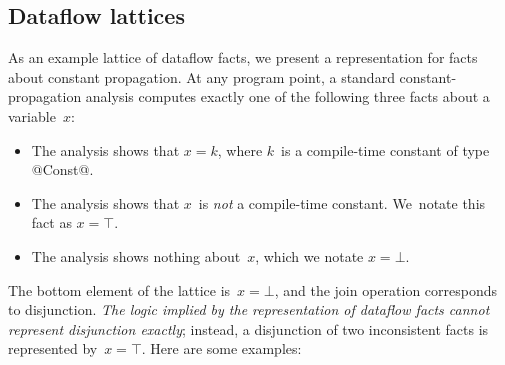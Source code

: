 \documentclass[blockstyle,preprint,nocopyrightspace]{sigplanconf}
\newcommand{\authornote}[1]{{\em #1}}
\def\authornote#1{\unskip\relax}
\newcommand{\simon}[1]{\authornote{SLPJ: #1}}
\newcommand{\norman}[1]{\authornote{NR: #1}}
\let\remark\norman
\begin{document}
\subsection{Dataflow lattices}


As an example lattice of dataflow facts, 
we present a representation for facts about constant propagation.
At any program point, a standard constant-propagation analysis
computes exactly one of the following three
facts about a variable~$x$:
\remark{We're a bit careless about distinguishing
 ``fact'' and ``assertion'', but the general idea is that an
 ``assertion'' is God's truth in logic and a ``fact'' is an
 approximation or representation of an assertion.
Perhaps future revisions will clarify.}
\begin{itemize}
\item
The analysis shows that
$x = k$, where $k$~is a compile-time constant of type @Const@.
\item
The analysis shows that $x$~is \emph{not} a compile-time constant.
We~notate this fact as $x = \top$.
\item
The analysis shows nothing about~$x$, which we notate $x=\bot$.
\end{itemize}
The bottom element of the lattice is~$x=\bot$, and
the join operation corresponds to disjunction.
\emph{The logic implied by the
representation of dataflow facts cannot represent disjunction
exactly}; instead, a
disjunction of two inconsistent facts is represented by~$x=\top$.
\simon{At this point it's very unclear why one should focus on 
disjunction here.  Why not conjunction, or something else?
I tried to fix that in my rewrite.}
Here are some examples:
\end{document}
